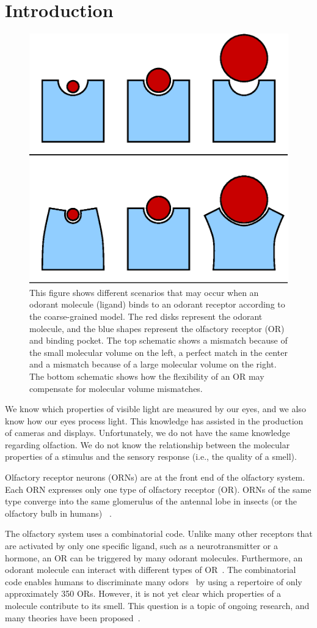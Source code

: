 \documentclass[fleqn,11pt]{wlscirep}
\begin{document}
\section*{Introduction}
\begin{figure}
	\centering
	\includegraphics[width=0.4 \textwidth]{binding-pocket-size-flex}
	\caption{This figure shows different scenarios that may occur when an odorant molecule (ligand) binds to an odorant receptor according to the coarse-grained model. 
		The red disks represent the odorant molecule, 
		and the blue shapes represent the olfactory receptor (OR) and binding pocket.	
		The top schematic shows a mismatch because of the small molecular volume on the left, 
		a perfect match in the center and a mismatch because of a large molecular volume on the right.
		The bottom schematic shows how the flexibility of an OR may compensate for molecular volume mismatches.
		}
	\label{fig:binding-pocket}
\end{figure}

We know which properties of visible light are measured by our eyes, and we also know how our eyes process light. 
This knowledge has assisted in the production of cameras and displays. 
Unfortunately, we do not have the same knowledge regarding olfaction. 
We do not know the relationship between the molecular properties of a stimulus and the sensory response (i.e., the quality of a smell). 

Olfactory receptor neurons (ORNs) are at the front end of the olfactory system.
Each ORN expresses only one type of olfactory receptor (OR). 
ORNs of the same type converge into the same glomerulus of the antennal lobe in insects (or the olfactory bulb in humans)
~\cite{root2007,Carey2011,Vosshall2000,Couto2005,fishilevich2005,gao2000,wang1998,mombaerts1996,vassar1994}.

The olfactory system uses a combinatorial code. 
Unlike many other receptors that are activated by only one specific ligand, such as a neurotransmitter or a hormone,
 an OR can be triggered by many odorant molecules. 
Furthermore, an odorant molecule can interact with different types of OR~\cite{Malnic2000}.
The combinatorial code enables humans to discriminate many odors~\cite{Bushdid2014} by using a repertoire of only approximately 350 ORs.
However, it is not yet clear which properties of a molecule contribute to its smell. 
This question is a topic of ongoing research, and many theories have been proposed~\cite{Turin,Keller2004,Araneda2000,Brookes2007,Franco2011,Pelz2006,Gabler2013,Schmuker2007,Haddad2008,Snitz2013,Yablonka2012,gane2013,
turin2015plausibility,block2015implausibility,vosshall2015laying}.
\end{document}

